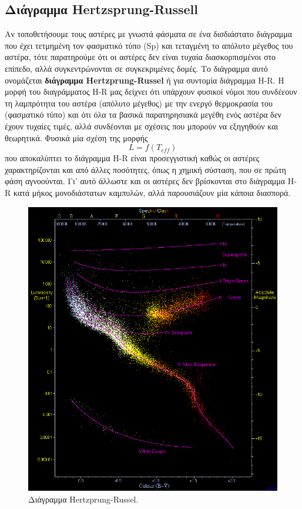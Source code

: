 \subsection{Διάγραμμα Hertzsprung-Russell}
Αν τοποθετήσουμε τους αστέρες με γνωστά φάσματα σε ένα δισδιάστατο διάγραμμα που έχει τετμημένη τον φασματικό τύπο (Sp) και τεταγμένη το απόλυτο μέγεθος του αστέρα, τότε παρατηρούμε ότι οι αστέρες δεν είναι τυχαία διασκορπισμένοι στο επίπεδο, αλλά συγκεντρώνονται σε συγκεκριμένες δομές. Το διάγραμμα αυτό ονομάζεται \textbf{διάγραμμα Hertzprung-Russel} ή για συντομία διάγραμμα H-R.
Η μορφή του διαγράμματος H-R μας δείχνει ότι υπάρχουν φυσικοί νόμοι που συνδέεουν τη λαμπρότητα του αστέρα (απόλυτο μέγεθος) με την ενεργό θερμοκρασία του (φασματικό τύπο) και ότι όλα τα βασικά παρατηρησιακά μεγέθη ενός αστέρα δεν έχουν τυχαίες τιμές, αλλά συνδέονται με σχέσεις που μπορούν να εξηγηθούν και θεωρητικά. Φυσικά μία σχέση της μορφής $$ L = f(T_{eff})$$ που αποκαλύπτει το διάγραμμα H-R είναι προσεγγιστική καθώς οι αστέρες χαρακτηρίζονται και από άλλες ποσότητες, όπως η χημική σύσταση, που σε πρώτη φάση αγνοούνται. Γι' αυτό άλλωστε και οι αστέρες δεν βρίσκονται στο διάγραμμα H-R κατά μήκος μονοδιάστατων καμπυλών, αλλά παρουσιάζουν μία κάποια διασπορά.

\begin{figure}[h]
    \centering
    \includegraphics[scale=0.4]{Figures/HRDiagram.png}
    \caption{Διάγραμμα Hertzprung-Russel.}
    \label{fig:HRD}
\end{figure}

